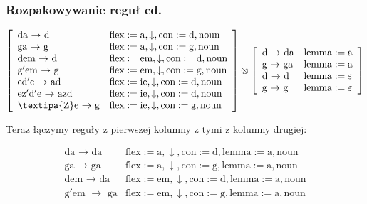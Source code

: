 \documentclass{beamer}
\begin{document}
\begin{frame}
\frametitle{Rozpakowywanie reguł cd.}
\begin{scriptsize}\[
\left[\begin{array}{ll}
\text{da $\rightarrow$ d} & \text{flex}:=\text{a}, \downarrow, \text{con}:=\text{d}, \text{noun}\\
\text{ga $\rightarrow$ g} & \text{flex}:=\text{a}, \downarrow, \text{con}:=\text{g}, \text{noun}\\
\text{dem $\rightarrow$ d} & \text{flex}:=\text{em}, \downarrow, \text{con}:=\text{d}, \text{noun}\\
\text{g$'$em $\rightarrow$ g} & \text{flex}:=\text{em}, \downarrow, \text{con}:=\text{g}, \text{noun}\\
\text{ed$'$e $\rightarrow$ ad} & \text{flex}:=\text{ie}, \downarrow, \text{con}:=\text{d}, \text{noun}\\
\text{ez$'$d$'$e $\rightarrow$ azd} & \text{flex}:=\text{ie}, \downarrow, \text{con}:=\text{d}, \text{noun}\\
\text{\textipa{Z}e $\rightarrow$ g} & \text{flex}:=\text{ie}, \downarrow, \text{con}:=\text{g}, \text{noun}\\
\end{array}\right] \otimes \left[\begin{array}{ll}
\text{d $\rightarrow$ da} & \text{lemma}:=\text{a}\\
\text{g $\rightarrow$ ga} & \text{lemma}:=\text{a}\\
\text{d $\rightarrow$ d} & \text{lemma}:=\text{$\varepsilon$}\\
\text{g $\rightarrow$ g} & \text{lemma}:=\text{$\varepsilon$}
\end{array}\right]
\]\end{scriptsize}
Teraz łączymy reguły z pierwszej kolumny z tymi z kolumny drugiej:
\begin{scriptsize}\[
\begin{array}{ll}
\text{da $\rightarrow$ da} & \text{flex}:=\text{a}, \downarrow, \text{con}:=\text{d}, \text{lemma}:=\text{a}, \text{noun}\\
\text{ga $\rightarrow$ ga} & \text{flex}:=\text{a}, \downarrow, \text{con}:=\text{g}, \text{lemma}:=\text{a}, \text{noun}\\
\text{dem $\rightarrow$ da} & \text{flex}:=\text{em}, \downarrow, \text{con}:=\text{d}, \text{lemma}:=\text{a}, \text{noun}\\
\text{g$'$em $\rightarrow$ ga} & \text{flex}:=\text{em}, \downarrow, \text{con}:=\text{g}, \text{lemma}:=\text{a}, \text{noun}\\

\end{array}\]
\end{scriptsize}
\end{frame}
\end{document}
